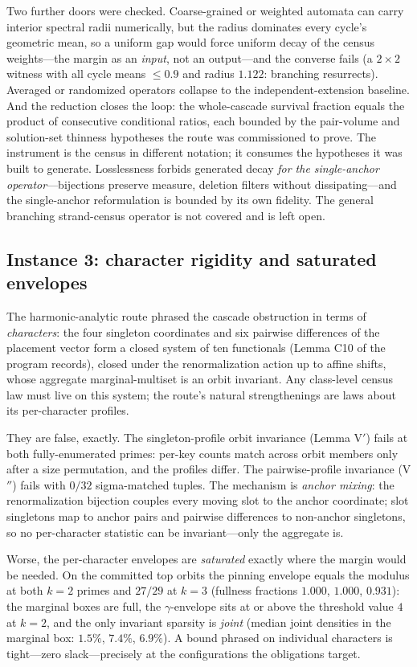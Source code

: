 Two further doors were checked. Coarse-grained or weighted automata can
carry interior spectral radii numerically, but the radius dominates every
cycle's geometric mean, so a uniform gap would force uniform decay of the
census weights---the margin as an \emph{input}, not an output---and the
converse fails (a $2\times2$ witness with all cycle means $\le0.9$ and
radius $1.122$: branching resurrects). Averaged or randomized operators
collapse to the independent-extension baseline. And the reduction closes
the loop: the whole-cascade survival fraction equals the product of
consecutive conditional ratios, each bounded by the pair-volume and
solution-set thinness hypotheses the route was commissioned to prove. The
instrument is the census in different notation; it consumes the
hypotheses it was built to generate. Losslessness forbids generated
decay \emph{for the single-anchor operator}---bijections preserve
measure, deletion filters without dissipating---and the single-anchor
reformulation is bounded by its own fidelity. The general branching
strand-census operator is not covered and is left open.

\subsection{Instance 3: character rigidity and saturated envelopes}
\label{sec:tm-char}

The harmonic-analytic route phrased the cascade obstruction in terms of
\emph{characters}: the four singleton coordinates and six pairwise
differences of the placement vector form a closed system of ten
functionals (Lemma C10 of the program records), closed under the
renormalization action up to affine shifts, whose aggregate
marginal-multiset is an orbit invariant. Any class-level census law must
live on this system; the route's natural strengthenings are laws about
its per-character profiles.

They are false, exactly. The singleton-profile orbit invariance (Lemma
V$'$) fails at both fully-enumerated primes: per-key counts match across
orbit members only after a size permutation, and the profiles differ. The
pairwise-profile invariance (V$''$) fails with $0/32$ sigma-matched
tuples. The mechanism is \emph{anchor mixing}: the renormalization
bijection couples every moving slot to the anchor coordinate; slot
singletons map to anchor pairs and pairwise differences to non-anchor
singletons, so no per-character statistic can be invariant---only the
aggregate is.

Worse, the per-character envelopes are \emph{saturated} exactly where the
margin would be needed. On the committed top orbits the pinning envelope
equals the modulus at both $k=2$ primes and $27/29$ at $k=3$ (fullness
fractions $1.000$, $1.000$, $0.931$): the marginal boxes are full, the
$\gamma$-envelope sits at or above the threshold value $4$ at $k=2$, and
the only invariant sparsity is \emph{joint} (median joint densities in
the marginal box: $1.5\%$, $7.4\%$, $6.9\%$). A bound phrased on
individual characters is tight---zero slack---precisely at the
configurations the obligations target.

